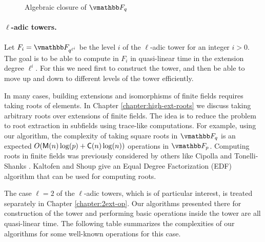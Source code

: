 \begin{figure}
\begin{center}
	\end{center}
	\caption{Algebraic closure of $\F_q$}
	\label{figure:alg-closure}
\end{figure}

\paragraph{$\ell$-adic towers.} Let $F_i = \F_{q^{\ell^i}}$ be the level $i$ of the $\ell$-adic 
tower for an integer $i > 0$. The goal is to be able to compute in $F_i$ in quasi-linear time in 
the extension degree $\ell^i$. For this we need first to construct the tower, and then be able to 
move up and down to different levels of the tower efficiently. 

In many cases, building extensions and isomorphisms of finite fields requires taking roots of 
elements. In Chapter \ref{chapter:high-ext-roots} we discuss taking arbitrary roots over extensions 
of finite fields. The idea is to reduce the problem to root extraction in subfields using 
trace-like computations. For example, using our algorithm, the complexity of taking square roots in 
$\F_q$ is an expected $O(\mathsf{M}(n)\log(p) + \mathsf{C}(n)\log(n))$ operations in $\F_p$. Computing roots in 
finite fields was previously considered by others like Cipolla \cite{Williams72} and Tonelli-Shanks 
\cite{Shanks1972}. Kaltofen and Shoup \cite{KaltofenShoup1997} give an Equal Degree Factorization 
(EDF) algorithm that can be used for computing roots.

The case $\ell = 2$ of the $\ell$-adic towers, which is of particular interest, is treated 
separately in Chapter \ref{chapter:2ext-op}. Our algorithms presented there for construction of the 
tower and performing basic operations inside the tower are all quasi-linear time. The following 
table summarizes the complexities of our algorithms for some well-known operations for this case.

